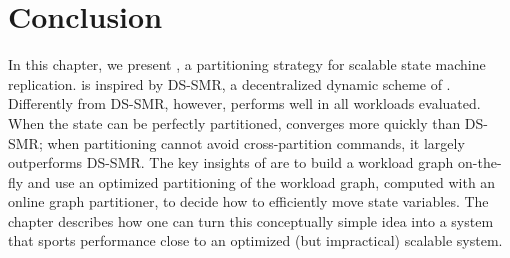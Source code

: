 \section{Conclusion}
\label{sec:dynastar-conclusion}

In this chapter, we present \dynastar, a partitioning strategy for scalable state
machine replication. \dynastar is inspired by DS-SMR, a decentralized dynamic
scheme of \dssmr. Differently from DS-SMR, however, \dynastar performs well in
all workloads evaluated. When the state can be perfectly partitioned, \dynastar
converges more quickly than DS-SMR; when partitioning cannot avoid
cross-partition commands, it largely outperforms DS-SMR. The key insights of
\dynastar are to build a workload graph on-the-fly and use an optimized
partitioning of the workload graph, computed with an online graph partitioner,
to decide how to efficiently move state variables. The chapter describes how one
can turn this conceptually simple idea into a system that sports performance
close to an optimized (but impractical) scalable system.
